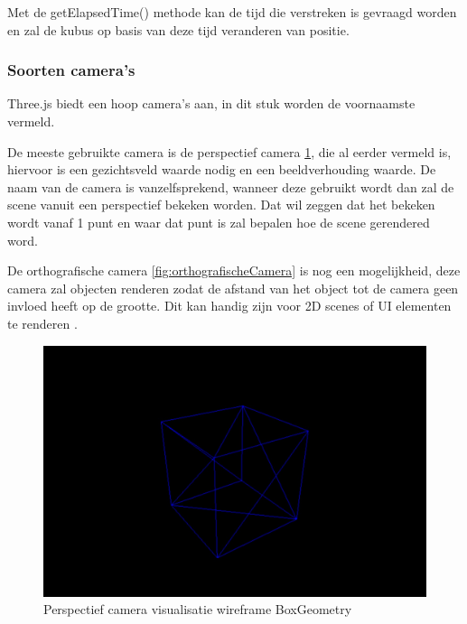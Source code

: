 Met de getElapsedTime() methode kan de tijd die verstreken is gevraagd worden en zal de kubus op basis van deze tijd veranderen van positie. 

\subsubsection{Soorten camera's}

Three.js biedt een hoop camera's aan, in dit stuk worden de voornaamste vermeld.

De meeste gebruikte camera is de perspectief camera \ref{fig:perspectiefCamera}, die al eerder vermeld is, hiervoor is een gezichtsveld waarde nodig en een beeldverhouding waarde. De naam van de camera is vanzelfsprekend, wanneer deze gebruikt wordt dan zal de scene vanuit een perspectief bekeken worden. Dat wil zeggen dat het bekeken wordt vanaf 1 punt en waar dat punt is zal bepalen hoe de scene gerendered word.

De orthografische camera \ref{fig:orthografischeCamera} is nog een mogelijkheid, deze camera zal objecten renderen zodat de afstand van het object tot de camera geen invloed heeft op de grootte. Dit kan handig zijn voor 2D scenes of UI elementen te renderen \autocite{threejs2023}.

\begin{figure}
	\centering
	\includegraphics[width=1\linewidth]{graphics/perspectiefCamera}
	\caption[Perspectief camera visualisatie]{Perspectief camera visualisatie wireframe BoxGeometry}
	\label{fig:perspectiefCamera}
\end{figure}

